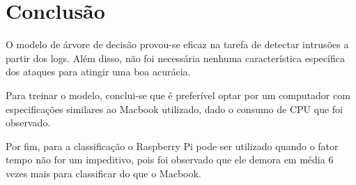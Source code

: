 
\chapter{Conclusão}
\label{cap:conclusao}

O modelo de árvore de decisão provou-se eficaz na tarefa de detectar intrusões
a partir dos logs. Além disso, não foi necessária nenhuma característica específica
dos ataques para atingir uma boa acurácia.

Para treinar o modelo, conclui-se que é preferível optar por um computador com 
especificações similares ao Macbook utilizado, dado o consumo de CPU que foi
observado.

Por fim, para a classificação o Raspberry Pi pode ser utilizado quando o fator 
tempo não for um impeditivo, pois foi observado que ele demora em média 6 vezes 
mais para classificar do que o Macbook.